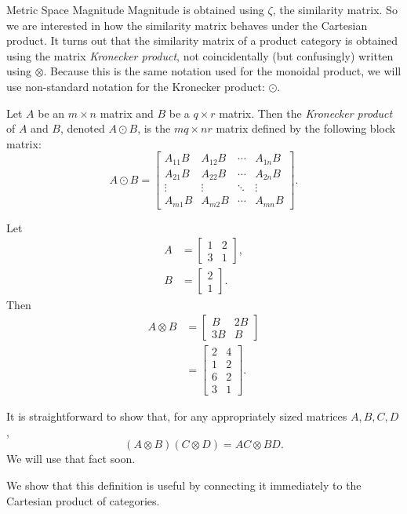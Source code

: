\documentclass[12pt]{pom_thesis}
\newcommand{\kron}{\odot}
\begin{document}
\begin{chapter}{Metric Space Magnitude}
Magnitude is obtained using $\zeta$, the similarity matrix. So we are interested in how the similarity matrix behaves under the Cartesian product. It turns out that the similarity matrix of a product category is obtained using the matrix \emph{Kronecker product}, not coincidentally (but confusingly) written using $\otimes$. Because this is the same notation used for the monoidal product, we will use non-standard notation for the Kronecker product: $\kron$.
\begin{defn}
Let $A$ be an $m \times n$ matrix and $B$ be a $q \times r$ matrix. Then the \emph{Kronecker product} of $A$ and $B$, denoted $A \kron B$, is the $mq \times nr$ matrix defined by the following block matrix:
\[
A \kron B = 
\begin{bmatrix}
A_{11}B & A_{12}B & \cdots & A_{1n}B \\
A_{21}B & A_{22}B & \cdots & A_{2n}B \\
\vdots & \vdots & \ddots & \vdots \\
A_{m1}B & A_{m2}B & \cdots & A_{mn}B
\end{bmatrix}.
\]
\end{defn}
\begin{examp}
Let 
\begin{align*}
A &= \begin{bmatrix}
1 & 2 \\
3 & 1
\end{bmatrix},\\
B &= \begin{bmatrix}
2  \\
1 
\end{bmatrix}.
\end{align*}
Then
\begin{align*}
A \otimes B &= 
\begin{bmatrix}
B & 2B\\
3B & B
\end{bmatrix}\\
&= \begin{bmatrix}
2 & 4 \\
1 & 2 \\
6 & 2\\
3 & 1
\end{bmatrix}.
\end{align*}
\end{examp}
\begin{rmk}\label{kron_prod}
It is straightforward to show that, for any appropriately sized matrices $A, B, C, D$,
\[
(A \otimes B) (C \otimes D) = AC \otimes BD.
\]
We will use that fact soon.
\end{rmk}
We show that this definition is useful by connecting it immediately to the Cartesian product of categories.


\end{chapter}
\end{document}
